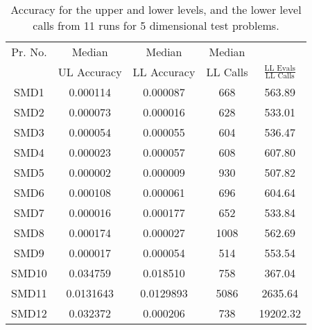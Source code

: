 \documentclass[twoside]{article}
\begin{document}
\begin{table*}[hbt]
\caption{Accuracy for the upper and lower levels, and the lower level calls from 11
  runs for 5 dimensional test problems.} 
\label{tab:table1b}
\begin{center}
\begin{tabular}{|c|c|c|c|c|} \hline
Pr. No. & Median & Median & Median &  \\ \cline{2-4}
	& UL Accuracy & LL Accuracy & LL Calls &  $\frac{\mbox{LL Evals}}{\mbox{LL Calls}}$ \\ \hline
SMD1 & 0.000114 & 0.000087 & 668 & 563.89 	\\	\hline
SMD2 & 0.000073 & 0.000016 & 628 & 533.01 	\\	\hline
SMD3 & 0.000054 & 0.000055 & 604 & 536.47 	\\	\hline
SMD4 & 0.000023 & 0.000057 & 608 & 607.80 	\\	\hline
SMD5 & 0.000002 & 0.000009 & 930 & 507.82 	\\	\hline
SMD6 & 0.000108 & 0.000061 & 696 & 604.64 	\\	\hline
SMD7 & 0.000016 & 0.000177 & 652 & 533.84 	\\	\hline
SMD8 & 0.000174 & 0.000027 & 1008 & 562.69 	\\	\hline
SMD9 & 0.000017 & 0.000054 & 514 & 553.54 	\\	\hline
SMD10 & 0.034759 & 0.018510 & 758 & 367.04 	\\	\hline
SMD11 & 0.0131643 & 0.0129893 & 5086 & 2635.64 \\	\hline
SMD12 & 0.032372 & 0.000206 & 738 & 19202.32 \\	\hline
\end{tabular}
\end{center}
\end{table*}
\end{document}
